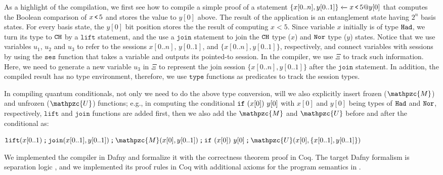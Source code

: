 As a highlight of the compilation, we first see how to compile a simple proof of a statement ${\{x[0..n],y[0..1]\}} \xleftarrow{} {x\,\texttt{<}\,5@y[0]}$ that computes the Boolean comparison of $x\,\texttt{<}\,5$ and stores the value to $y[0]$ above.
The result of the application is an entanglement state having $2^n$ basis states. For every basis state, the $y[0]$ bit position stores the the result of computing $x<5$.
Since variable $x$ initially is of type $\texttt{Had}$, we turn its type to $\texttt{CH}$ by a $\texttt{lift}$ statement, and the use a $\texttt{join}$ statement to join the $\texttt{CH}$ type ($x$) and $\texttt{Nor}$ type ($y$) states.
Notice that we use variables $u_1$, $u_2$ and $u_3$ to refer to the sessions $x[0..n]$, $y[0..1]$, and $\{x[0..n],y[0..1]\}$, respectively, and connect variables with sessions by using the $\texttt{ses}$ function that takes a variable and outputs its pointed-to session. In the \qafny compiler, we use $\Xi$ to track such information. Here, we need to generate a new variable $u_3$ in $\Xi$ to represent the join session $\{x[0..n],y[0..1]\}$ after the $\texttt{join}$ statement. 
In addition, the compiled result has no type environment, therefore, we use $\texttt{type}$ functions as predicates to track the session types.

In compiling quantum conditionals, not only we need to do the above type conversion, will we also explicitly insert frozen ($\mathpzc{M}$) and unfrozen ($\mathpzc{U}$) functions; e.g., in computing the conditional $\texttt{if}~{(x[0])}~{y[0]}$ with $x[0]$ and $y[0]$ being types of $\texttt{Had}$ and $\texttt{Nor}$, respectively, $\texttt{lift}$ and $\texttt{join}$ functions are added first, then we also add the $\mathpzc{M}$ and $\mathpzc{U}$ before and after the conditional as:

{\footnotesize
\begin{center}
${\sseq{\texttt{lift}(x[0..1)}{\sseq{\texttt{join}(x[0..1],y[0..1])}{\sseq{\sseq{\mathpzc{M}(x[0],y[0..1])}{\sifq{x[0]}{y[0]}}}{\mathpzc{U}(x[0],\{x[0..1],y[0..1]\})}}}}$
\end{center}
}

We implemented the compiler in Dafny and formalize it with the correctness theorem proof in Coq. The target Dafny formalism is separation logic \cite{separationlogic}, and we implemented its proof rules in Coq 
with additional axioms for the \qafny program semantics in .

